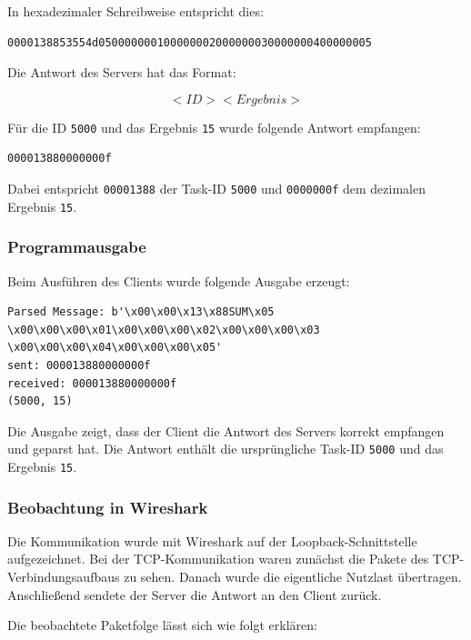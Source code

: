 \documentclass{kdiartcl}
\begin{document}
In hexadezimaler Schreibweise entspricht dies:

\begin{verbatim}
0000138853554d050000000100000002000000030000000400000005
\end{verbatim}

Die Antwort des Servers hat das Format:

\[
<ID><Ergebnis>
\]

Für die ID \texttt{5000} und das Ergebnis \texttt{15} wurde folgende Antwort empfangen:

\begin{verbatim}
000013880000000f
\end{verbatim}

Dabei entspricht \texttt{00001388} der Task-ID \texttt{5000} und
\texttt{0000000f} dem dezimalen Ergebnis \texttt{15}.

\subsubsection{Programmausgabe}

Beim Ausführen des Clients wurde folgende Ausgabe erzeugt:

\begin{verbatim}
Parsed Message: b'\x00\x00\x13\x88SUM\x05
\x00\x00\x00\x01\x00\x00\x00\x02\x00\x00\x00\x03
\x00\x00\x00\x04\x00\x00\x00\x05'
sent: 000013880000000f
received: 000013880000000f
(5000, 15)
\end{verbatim}

Die Ausgabe zeigt, dass der Client die Antwort des Servers korrekt empfangen und geparst
hat. Die Antwort enthält die ursprüngliche Task-ID \texttt{5000} und das Ergebnis
\texttt{15}.

\subsubsection{Beobachtung in Wireshark}

Die Kommunikation wurde mit Wireshark auf der Loopback-Schnittstelle aufgezeichnet.
Bei der TCP-Kommunikation waren zunächst die Pakete des TCP-Verbindungsaufbaus zu
sehen. Danach wurde die eigentliche Nutzlast übertragen. Anschließend sendete der
Server die Antwort an den Client zurück.

Die beobachtete Paketfolge lässt sich wie folgt erklären:
\end{document}

